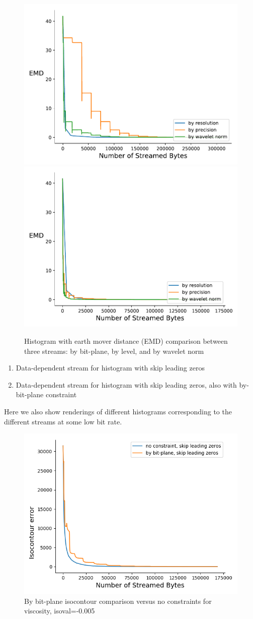 \begin{figure}[htb!]
	\centering
	{\includegraphics[width=0.4\linewidth]{img/independent/histogram-miranda-viscosity}}
	{\includegraphics[width=0.4\linewidth]{img/skip-zeros/histogram-miranda-viscosity}}
	\caption {Histogram with earth mover distance (EMD) comparison between three streams: by bit-plane, by level, and by wavelet norm}
	\label{fig:histogram_traditional_vs_by_norm_viscosity}
\end{figure}



\begin{enumerate}
  \item Data-dependent stream for histogram with skip leading zeros
  \item Data-dependent stream for histogram with skip leading zeros, also with by-bit-plane constraint
\end{enumerate}  
  Here we also show renderings of different histograms corresponding to the different streams at some low bit rate.

\begin{figure}
  \centering
  \includegraphics[width=0.8\linewidth]{resources/isocontour-error-by-bit-plane-viscosity.png}
  \caption {By bit-plane isocontour comparison versus no constraints for viscosity, isoval=-0.005}
  \label{fig:by_bit_plane_isocontour}
\end{figure}
